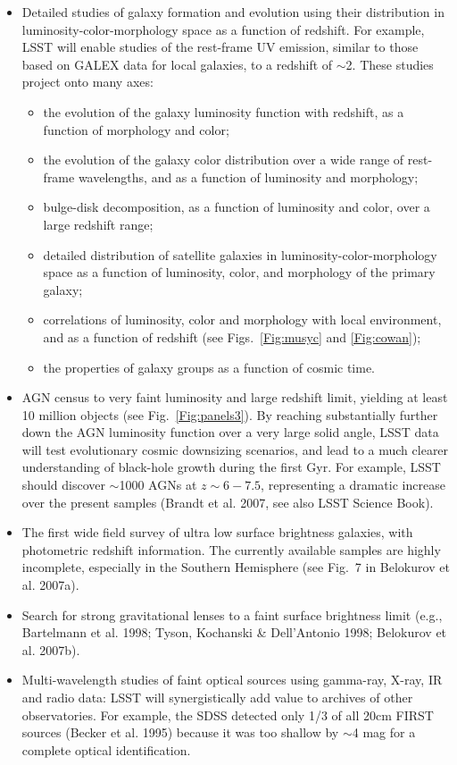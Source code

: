 \documentclass{emulateapj}
\newcommand{\B}[1]{{#1}}
\begin{document}
\begin{itemize}
\item Detailed studies of galaxy formation and evolution using their distribution in 
luminosity-color-morphology space as a function of redshift. For example, LSST will 
enable studies of the rest-frame UV emission, similar to those based on GALEX data 
for local galaxies, to a redshift of $\sim$2. These studies project onto many axes:
\begin{itemize}
  \item the evolution of the galaxy luminosity function with redshift, as a function of 
        morphology and color;
  \item the evolution of the galaxy color distribution over a wide range of rest-frame 
        wavelengths, and as a function of luminosity and morphology; 
  \item bulge-disk decomposition, as a function of luminosity and color, over 
        a large redshift range; 
  \item detailed distribution of satellite galaxies in luminosity-color-morphology space 
        as a function of luminosity, color, and morphology of the primary galaxy; 
  \item correlations of luminosity, color and morphology with local environment, and
        as a function of redshift (see  Figs.~\ref{Fig:musyc} and \ref{Fig:cowan});
  \item the properties of galaxy groups as a function of cosmic time.
\end{itemize}
\item AGN census to very faint luminosity and large redshift limit, yielding
      at least 10 million objects (see Fig.~\ref{Fig:panels3}). By reaching substantially further 
      down the AGN luminosity function over a very large solid angle, LSST data 
      will test evolutionary cosmic downsizing scenarios, and lead 
      to a much clearer understanding of black-hole growth during the first Gyr. For
      example, LSST should discover $\sim$1000 AGNs at $z\sim6-7.5$,
      representing a dramatic increase over the present samples 
      (Brandt et al. 2007, see also LSST Science Book).
\item The first wide field survey of ultra low surface brightness galaxies, with 
      photometric redshift information. The currently available samples are highly
      incomplete, especially in the Southern Hemisphere (see Fig.~7 in Belokurov et al. 2007a). 
\item Search for strong gravitational lenses to a faint surface brightness limit (e.g., 
      Bartelmann et al. 1998; Tyson, Kochanski \& Dell'Antonio 1998; Belokurov et al. 2007b).
\item Multi-wavelength studies of faint optical sources using gamma-ray, X-ray, IR and
      radio data: \B{LSST will synergistically add value to archives of other observatories.}
      For example, the SDSS detected only 1/3 of all 20cm FIRST sources 
      (Becker et al. 1995) because it was too shallow by $\sim$4 mag for a complete 
      optical identification. 
\end{itemize}
\end{document}
